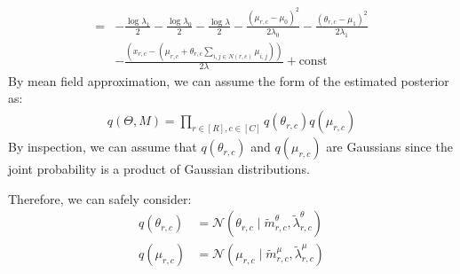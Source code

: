\documentclass[12pt]{article}
\newenvironment{problem}[2][Problem]{\begin{trivlist}
\item[\hskip \labelsep {\bfseries #1}\hskip \labelsep {\bfseries #2.}]}{\end{trivlist}}
\begin{document}
\begin{problem}{2.9.25}
\begin{align*}
    =& -\frac{\log \lambda_1}{2} -\frac{\log \lambda_0}{2} -\frac{\log \lambda}{2} 
       - \frac{(\mu_{r,c} - \mu_0)^2}{2\lambda_0} - \frac{(\theta_{r,c} - \mu_1)^2}{2\lambda_1} \\
     & - \frac{(x_{r,c} - (\mu_{r,c} + \theta_{r,c}\sum_{i,j \in N(r,c)}\mu_{i,j}))}{2\lambda} + \text{const}
\end{align*}
By mean field approximation, we can assume the form of the estimated posterior as:
\begin{align*}
    q(\Theta, M) = \prod_{r \in [R], c\in [C]} q(\theta_{r,c})q(\mu_{r,c})
\end{align*}
By inspection, we can assume that $q(\theta_{r,c})$ and $q(\mu_{r,c})$ are Gaussians
since the joint probability is a product of Gaussian distributions.

Therefore, we can safely consider:
\begin{align*}
    q(\theta_{r,c}) &= \mathcal{N}(\theta_{r,c} 
                \mid \tilde{m}^{\theta}_{r,c}, \tilde{\lambda}^{\theta}_{r,c}) \\
    q(\mu_{r,c}) &= \mathcal{N}(\mu_{r,c} 
                \mid \tilde{m}^{\mu}_{r,c}, \tilde{\lambda}^{\mu}_{r,c})
\end{align*}
\end{problem}


\end{document}
